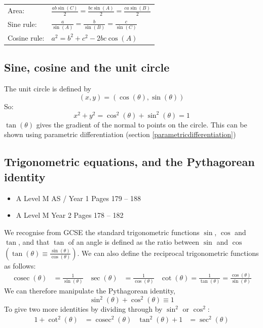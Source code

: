 \documentclass[11pt, a4paper]{article}
\DeclareMathOperator{\cosec}{cosec}
\begin{document}
\begin{table}[H]
\renewcommand{\arraystretch}{1.25}
\begin{tabular}{ll}
Area: & $\frac{ab\sin(C)}{2}=\frac{bc\sin(A)}{2}=\frac{ca\sin(B)}{2}$ \\
Sine rule: & $\frac{a}{\sin(A)}=\frac{b}{\sin(B)}=\frac{c}{\sin(C)}$ \\
Cosine rule: & $a^{2} = b^{2} + c^{2} - 2bc\cos(A)$ \\
\end{tabular}
\end{table}
\vspace{0.5cm}


\subsection{Sine, cosine and the unit circle}
The unit circle is defined by
\begin{equation*}
(x,y)=(\cos(\theta),\sin(\theta))
\end{equation*}
So:
\begin{equation*}
x^{2}+y^{2}=\cos^{2}(\theta)+\sin^{2}(\theta)=1
\end{equation*}
$\tan(\theta)$ gives the gradient of the normal to points on the circle. This can be shown using parametric differentiation (section \ref{parametricdifferentiation})

\vspace{0.5cm}


\subsection{Trigonometric equations, and the Pythagorean identity}
\begin{itemize}
\item A Level M AS / Year 1 \hspace{1cm} \phantom{ } Pages 179 -- 188
\item A Level M Year 2 \hspace{1cm} \phantom{ AS / } Pages 178 -- 182
\end{itemize} \par
We recognise from GCSE the standard trigonometric functions $\sin$, $\cos$ and $\tan$, and that $\tan$ of an angle is defined as the ratio between $\sin$ and $\cos$ $\left(\tan(\theta)\equiv\frac{\sin(\theta)}{\cos(\theta)}\right)$. We can also define the reciprocal trigonometric functions as follows:
\small
\begin{align*}
\cosec(\theta)&=\frac{1}{\sin(\theta)} & \sec(\theta)&=\frac{1}{\cos(\theta)} & \cot(\theta)=\frac{1}{\tan(\theta)}=\frac{\cos(\theta)}{\sin(\theta)}
\end{align*}
\normalsize
We can therefore manipulate the Pythagorean identity,
\begin{equation*}
\sin^{2}(\theta)+\cos^{2}(\theta)\equiv1
\end{equation*}
To give two more identities by dividing through by $\sin^{2}$ or $\cos^{2}$:
\begin{align*}
1+\cot^{2}(\theta)&=\cosec^{2}(\theta) & \tan^{2}(\theta)+1&=\sec^{2}(\theta)
\end{align*}
\normalsize
\end{document}
